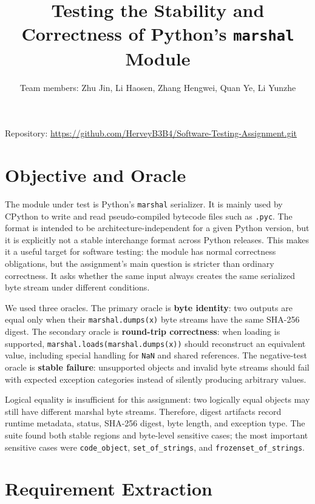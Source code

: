 \documentclass[10pt,a4paper]{article}
\title{\vspace{-1.3em}Testing the Stability and Correctness of Python's \texttt{marshal} Module}
\author{Team members: Zhu Jin, Li Haosen, Zhang Hengwei, Quan Ye, Li Yunzhe}
\date{}
\begin{document}
\maketitle
\vspace{-1.5em}

\begin{center}
Repository: \url{https://github.com/HerveyB3B4/Software-Testing-Assignment.git}
\end{center}

\section{Objective and Oracle}

The module under test is Python's \texttt{marshal} serializer. It is mainly used by CPython to write and read pseudo-compiled bytecode files such as \texttt{.pyc}. The format is intended to be architecture-independent for a given Python version, but it is explicitly not a stable interchange format across Python releases. This makes it a useful target for software testing: the module has normal correctness obligations, but the assignment's main question is stricter than ordinary correctness. It asks whether the same input always creates the same serialized byte stream under different conditions.

We used three oracles. The primary oracle is \textbf{byte identity}: two outputs are equal only when their \texttt{marshal.dumps(x)} byte streams have the same SHA-256 digest. The secondary oracle is \textbf{round-trip correctness}: when loading is supported, \texttt{marshal.loads(marshal.dumps(x))} should reconstruct an equivalent value, including special handling for \texttt{NaN} and shared references. The negative-test oracle is \textbf{stable failure}: unsupported objects and invalid byte streams should fail with expected exception categories instead of silently producing arbitrary values.

Logical equality is insufficient for this assignment: two logically equal objects may still have different marshal byte streams. Therefore, digest artifacts record runtime metadata, status, SHA-256 digest, byte length, and exception type. The suite found both stable regions and byte-level sensitive cases; the most important sensitive cases were \texttt{code\_object}, \texttt{set\_of\_strings}, and \texttt{frozenset\_of\_strings}.

\section{Requirement Extraction}
\end{document}

